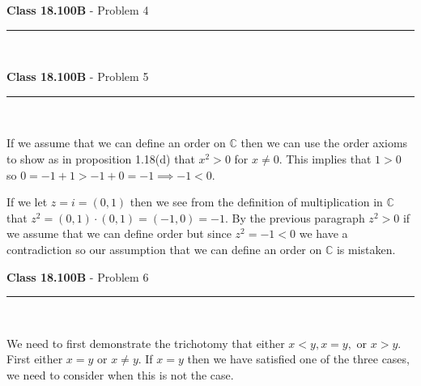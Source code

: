 \documentclass[11pt,reqno]{article}
\begin{document}
\vspace{15pt}
\begin{flushleft} 
\textbf{Class 18.100B} - Problem 4\\
\rule{500pt}{1pt}\\
\end{flushleft} 

\vspace{15pt}
\begin{flushleft} 
\textbf{Class 18.100B} - Problem 5\\
\rule{500pt}{1pt}\\
\end{flushleft} 

If we assume that we can define an order on $\mathbb{C}$ then we can use the order axioms to show as in proposition 1.18(d) that $x^2 > 0$ for $x \neq 0$. This implies that $1 > 0$ so $0 = -1 + 1 > -1 + 0 = -1 \implies -1 < 0$.

If we let $z = i = (0,1)$ then we see from the definition of multiplication in $\mathbb{C}$ that $z^2 = (0,1)\cdot(0,1) = (-1,0) = -1$. By the previous paragraph $z^2 > 0$ if we assume that we can define order but since $z^2 = -1 < 0$ we have a contradiction so our assumption that we can define an order on $\mathbb{C}$ is mistaken.

\vspace{15pt}
\begin{flushleft} 
\textbf{Class 18.100B} - Problem 6\\
\rule{500pt}{1pt}\\
\end{flushleft} 


We need to first demonstrate the trichotomy that either $x < y, x = y,$ or $x > y$. First either $x = y$ or $x \neq y$. If $x = y$ then we have satisfied one of the three cases, we need to consider when this is not the case.
\end{document}
